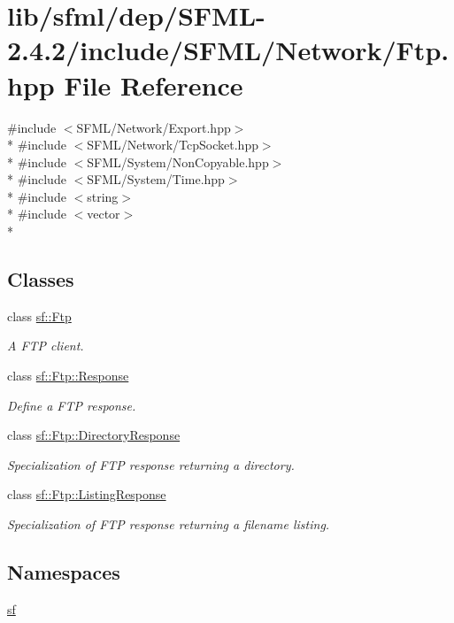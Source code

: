 \hypertarget{sfml_2dep_2_s_f_m_l-2_84_82_2include_2_s_f_m_l_2_network_2_ftp_8hpp}{\section{lib/sfml/dep/\-S\-F\-M\-L-\/2.4.2/include/\-S\-F\-M\-L/\-Network/\-Ftp.hpp File Reference}
\label{sfml_2dep_2_s_f_m_l-2_84_82_2include_2_s_f_m_l_2_network_2_ftp_8hpp}
}
{\ttfamily \#include $<$S\-F\-M\-L/\-Network/\-Export.\-hpp$>$}\\*
{\ttfamily \#include $<$S\-F\-M\-L/\-Network/\-Tcp\-Socket.\-hpp$>$}\\*
{\ttfamily \#include $<$S\-F\-M\-L/\-System/\-Non\-Copyable.\-hpp$>$}\\*
{\ttfamily \#include $<$S\-F\-M\-L/\-System/\-Time.\-hpp$>$}\\*
{\ttfamily \#include $<$string$>$}\\*
{\ttfamily \#include $<$vector$>$}\\*
\subsection*{Classes}
\begin{DoxyCompactItemize}
\item 
class \hyperlink{classsf_1_1_ftp}{sf\-::\-Ftp}
\begin{DoxyCompactList}\small\item\em A F\-T\-P client. \end{DoxyCompactList}\item 
class \hyperlink{classsf_1_1_ftp_1_1_response}{sf\-::\-Ftp\-::\-Response}
\begin{DoxyCompactList}\small\item\em Define a F\-T\-P response. \end{DoxyCompactList}\item 
class \hyperlink{classsf_1_1_ftp_1_1_directory_response}{sf\-::\-Ftp\-::\-Directory\-Response}
\begin{DoxyCompactList}\small\item\em Specialization of F\-T\-P response returning a directory. \end{DoxyCompactList}\item 
class \hyperlink{classsf_1_1_ftp_1_1_listing_response}{sf\-::\-Ftp\-::\-Listing\-Response}
\begin{DoxyCompactList}\small\item\em Specialization of F\-T\-P response returning a filename listing. \end{DoxyCompactList}\end{DoxyCompactItemize}
\subsection*{Namespaces}
\begin{DoxyCompactItemize}
\item 
\hyperlink{namespacesf}{sf}
\end{DoxyCompactItemize}
